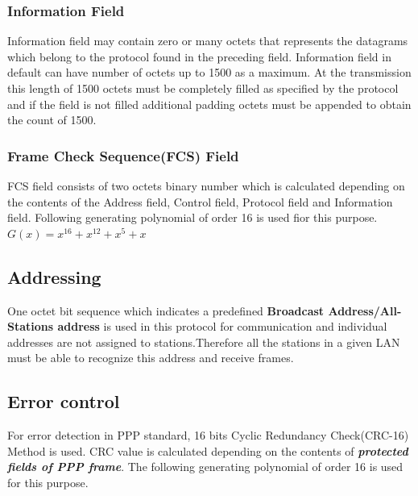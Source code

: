 \documentclass[a4paper,11pt]{article}%
\begin{document}
\subsubsection{Information Field}
Information field may contain zero or many octets  that represents the datagrams  which belong to the protocol found in the preceding field. Information field in default can have  number of octets up to 1500 as a maximum. At the transmission this length of 1500 octets must be completely filled as specified by the protocol and if the field is not filled additional padding octets must be appended to obtain the count of 1500.

\subsubsection{Frame Check Sequence(FCS) Field }

FCS field consists of two octets binary number which is calculated depending on the contents of the Address field, Control field, Protocol field and Information field. Following generating polynomial of  order 16 is used fior this purpose.\\


$G(x) = x^{16}+x^{12}+x^{5}+x$



\subsection{Addressing}

One octet bit sequence which indicates a predefined \textbf{Broadcast Address/All-Stations address} is used in this protocol for communication and  individual addresses are not assigned to stations.Therefore all the stations in a given LAN must be able to recognize this address and receive frames.\\








\subsection{Error control}
For error detection in PPP standard, 16 bits Cyclic Redundancy Check(CRC-16) Method is used. CRC value is calculated depending on the contents of \textit{\textbf{protected fields of PPP frame}}. The following generating polynomial of order 16 is used for this purpose.\\
\end{document}
